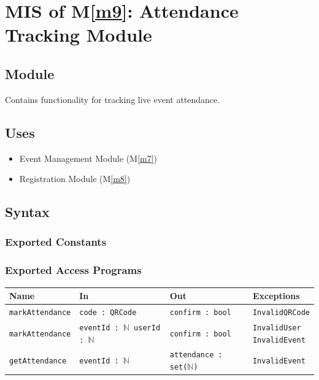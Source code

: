 \documentclass[12pt, titlepage]{article}
\begin{document}
\newpage

\section{MIS of M\ref{m9}: Attendance Tracking Module}

\subsection{Module}
Contains functionality for tracking live event attendance.

\subsection{Uses}

\begin{itemize}
  \item Event Management Module (M\ref{m7})
  \item Registration Module (M\ref{m8})
\end{itemize}


\subsection{Syntax}

\subsubsection{Exported Constants}

\subsubsection{Exported Access Programs}

\begin{center}
\begin{tabularx}{\textwidth}{p{10em} X X X}
\hline
\textbf{Name} & \textbf{In} & \textbf{Out} & \textbf{Exceptions} \\
\hline
\texttt{markAttendance} &
\parbox[t]{\hsize}{\texttt{code : QRCode}} &
\texttt{confirm : bool} &
\parbox[t]{\hsize}{\texttt{InvalidQRCode}} \\

\texttt{markAttendance} &
\parbox[t]{\hsize}{\texttt{eventId : $\mathbb{N}$ \\ userId : $\mathbb{N}$}} &
\texttt{confirm : bool} &
\parbox[t]{\hsize}{\texttt{InvalidUser \\ InvalidEvent}} \\

\texttt{getAttendance} &
\parbox[t]{\hsize}{\texttt{eventId : $\mathbb{N}$}} &
\texttt{attendance : set($\mathbb{N}$)} &
\parbox[t]{\hsize}{\texttt{InvalidEvent}} \\
\hline
\end{tabularx}
\end{center}
\end{document}
